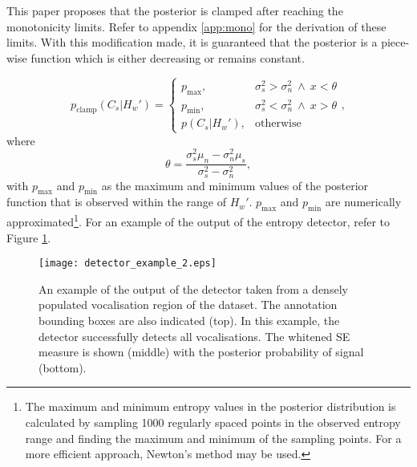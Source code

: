 {This paper proposes that the posterior is clamped after reaching the monotonicity limits. Refer to appendix \ref{app:mono} for the derivation of these limits. With this modification made, it is guaranteed that the posterior is a piece-wise function which is either decreasing or remains constant.

\begin{equation}
p_{\text{clamp}}(C_s | H_w') = 
    \begin{cases}
        p_\text{max},&  \sigma_s^2 > \sigma_n^2 \ \wedge \  x < \theta \\
        p_\text{min},& \sigma_s^2 < \sigma_n^2 \ \wedge \ x > \theta\\
        p(C_s | H_w'),&  \text{otherwise}
    \end{cases},
\end{equation}
where
\begin{equation}
    \theta = \frac{\sigma_s^2\mu_n - \sigma_n^2\mu_s}{\sigma_s^2 - \sigma_n^2},
\end{equation}
with $p_\text{max}$ and $p_\text{min}$ as the maximum and minimum values of the posterior function that is observed within the range of $H_w'$.
$p_\text{max}$ and $p_\text{min}$ are numerically approximated\footnote{The maximum and minimum entropy values in the posterior distribution is calculated by sampling 1000 regularly spaced points in the observed entropy range and finding the maximum and minimum of the sampling points. For a more efficient approach, Newton's method may be used.}. For an example of the output of the entropy detector, refer to Figure \ref{fig:det_example_1}. 

\begin{figure}[]
    \centering
    \texttt{[image: detector\_example\_2.eps]}
    \caption{An example of the output of the detector taken from a densely populated vocalisation region of the dataset. The annotation bounding boxes are also indicated (top). In this example, the detector successfully detects all vocalisations. The whitened SE measure is shown (middle) with the posterior probability of signal (bottom).}
    \label{fig:det_example_1}
\end{figure}




}
